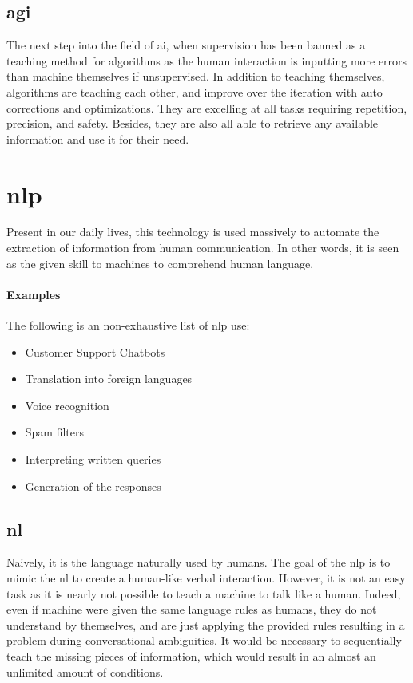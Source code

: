 \subsection{\gls{agi}}
The next step into the field of \gls{ai}, when supervision has been banned as a teaching method for algorithms as the human interaction is inputting more errors than machine themselves if unsupervised. In addition to teaching themselves, algorithms are teaching each other, and improve over the iteration with auto corrections and optimizations. They are excelling at all tasks requiring repetition, precision, and safety. Besides, they are also all able to retrieve any available information and use it for their need. 


\section{\gls{nlp}}
Present in our daily lives, this technology is used massively to automate the extraction of information from human communication. In other words, it is seen as the given skill to machines to comprehend human language.

\paragraph{Examples}
The following is an non-exhaustive list of \gls{nlp} use:
\begin{itemize}
    \setlength\itemsep{0em}
    \item Customer Support Chatbots
    \item Translation into foreign languages
    \item Voice recognition
    \item Spam filters
    \item Interpreting written queries
    \item Generation of the responses
\end{itemize}

\subsection{\gls{nl}}
Naively, it is the language naturally used by humans. The goal of the \gls{nlp} is to mimic the \gls{nl} to create a human-like verbal interaction. However, it is not an easy task as it is nearly not possible to teach a machine to talk like a human. Indeed, even if machine were given the same language rules as humans, they do not understand by themselves, and are just applying the provided rules resulting in a problem during conversational ambiguities. It would be necessary to sequentially teach the missing pieces of information, which would result in an almost an unlimited amount of conditions.

